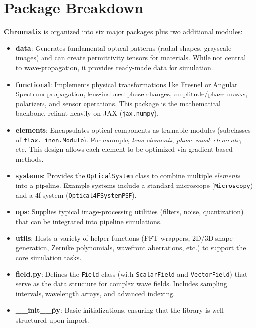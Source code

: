 \documentclass[a4paper,12pt]{report}
\begin{document}
\section{Package Breakdown}
\textbf{Chromatix} is organized into six major packages plus two additional modules:
\begin{itemize}
    \item \textbf{data}: Generates fundamental optical patterns (radial shapes, grayscale images) and can create permittivity tensors for materials. While not central to wave-propagation, it provides ready-made data for simulation.
    \item \textbf{functional}: Implements physical transformations like Fresnel or Angular Spectrum propagation, lens-induced phase changes, amplitude/phase masks, polarizers, and sensor operations. This package is the mathematical backbone, reliant heavily on JAX (\texttt{jax.numpy}).
    \item \textbf{elements}: Encapsulates optical components as trainable modules (subclasses of \texttt{flax.linen.Module}). For example, \textit{lens elements}, \textit{phase mask elements}, etc. This design allows each element to be optimized via gradient-based methods.
    \item \textbf{systems}: Provides the \texttt{OpticalSystem} class to combine multiple \textit{elements} into a pipeline. Example systems include a standard microscope (\texttt{Microscopy}) and a 4f system (\texttt{Optical4FSystemPSF}).
    \item \textbf{ops}: Supplies typical image-processing utilities (filters, noise, quantization) that can be integrated into pipeline simulations.
    \item \textbf{utils}: Hosts a variety of helper functions (FFT wrappers, 2D/3D shape generation, Zernike polynomials, wavefront aberrations, etc.) to support the core simulation tasks.
    \item \textbf{field.py}: Defines the \texttt{Field} class (with \texttt{ScalarField} and \texttt{VectorField}) that serve as the data structure for complex wave fields. Includes sampling intervals, wavelength arrays, and advanced indexing.
    \item \textbf{\_\_init\_\_\.py}: Basic initializations, ensuring that the library is well-structured upon import.
\end{itemize}
\end{document}
